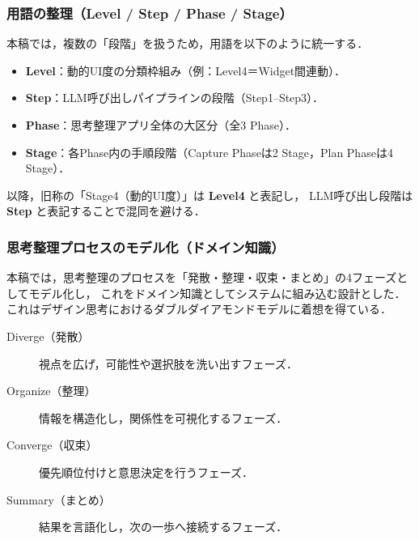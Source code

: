 \documentclass[a4paper,10pt]{jarticle}
\begin{document}
\subsubsection{用語の整理（Level / Step /  Phase / Stage）}
本稿では，複数の「段階」を扱うため，用語を以下のように統一する．

\begin{itemize}
  \item \textbf{Level}：動的UI度の分類枠組み（例：Level4＝Widget間連動）．
  \item \textbf{Step}：LLM呼び出しパイプラインの段階（Step1--Step3）．
  \item \textbf{Phase}：思考整理アプリ全体の大区分（全3 Phase）．
  \item \textbf{Stage}：各Phase内の手順段階（Capture Phaseは2 Stage，Plan Phaseは4 Stage）．
\end{itemize}

以降，旧称の「Stage4（動的UI度）」は \textbf{Level4} と表記し，
LLM呼び出し段階は \textbf{Step} と表記することで混同を避ける．




\subsubsection{思考整理プロセスのモデル化（ドメイン知識）}
本稿では，思考整理のプロセスを「発散・整理・収束・まとめ」の4フェーズとしてモデル化し，
これをドメイン知識としてシステムに組み込む設計とした．
これはデザイン思考におけるダブルダイアモンドモデル\cite{design_council2005}に着想を得ている．

\begin{description}
  \item[Diverge（発散）] 視点を広げ，可能性や選択肢を洗い出すフェーズ．
  \item[Organize（整理）] 情報を構造化し，関係性を可視化するフェーズ．
  \item[Converge（収束）] 優先順位付けと意思決定を行うフェーズ．
  \item[Summary（まとめ）] 結果を言語化し，次の一歩へ接続するフェーズ．
\end{description}
\end{document}

